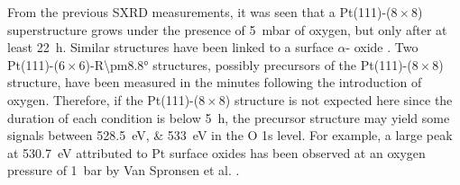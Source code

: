 From the previous SXRD measurements, it was seen that a Pt(111)-($8\times8$) superstructure grows under the presence of \qty{5}{\milli\bar} of oxygen, but only after at least \qty{22}{\hour}.
Similar structures have been linked to a surface $\alpha$- oxide \parencite{Ackermann2007, Ellinger2008}.
Two Pt(111)-($6\times6$)-R\ang{\pm8.8} structures, possibly precursors of the Pt(111)-($8\times8$) structure, have been measured in the minutes following the introduction of oxygen.
Therefore, if the Pt(111)-($8\times8$) structure is not expected here since the duration of each condition is below \qty{5}{\hour}, the precursor structure may yield some signals between \qtylist{528.5;533}{\eV} in the O 1s level.
For example, a large peak at \qty{530.7}{\eV} attributed to Pt surface oxides has been observed at an oxygen pressure of \qty{1}{\bar} by Van Spronsen et al. \parencite{VanSpronsen2017}.

